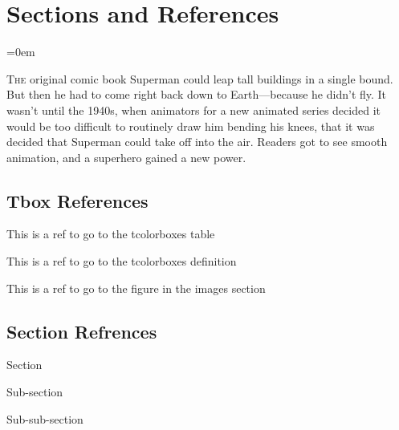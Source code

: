 





\section{Sections and References}
\label{sec:sections_and_references}
\parindent=0em

\lettrine[lines=3, findent=3pt, nindent=0pt]{T}{he} original comic book Superman
could leap tall buildings in a single bound. But then he had to come right back
down to Earth—because he didn't fly. It wasn't until the 1940s, when animators
for a new animated series decided it would be too difficult to routinely draw
him bending his knees, that it was decided that Superman could take off into the
air. Readers got to see smooth animation, and a superhero gained a new power.
\vspace{0.5cm}

\subsection{Tbox References}
\label{ssec:tbox_references}

This is a ref to go to the tcolorboxes table 

This is a ref to go to the tcolorboxes definition 

This is a ref to go to the figure in the images section 

\subsectionend

\vspace{0.5cm}

\subsection{Section Refrences}
\label{ssec:section_refrences}

Section 

Sub-section 

Sub-sub-section 



